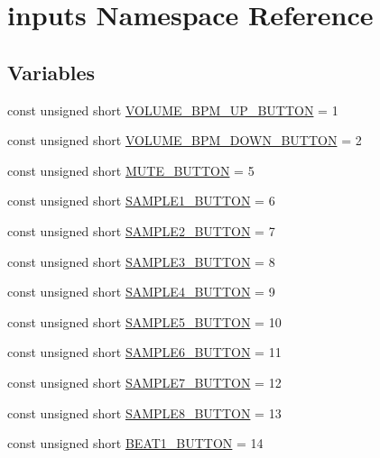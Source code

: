 \hypertarget{namespaceinputs}{}\section{inputs Namespace Reference}
\label{namespaceinputs}
\subsection*{Variables}
\begin{DoxyCompactItemize}
\item 
const unsigned short \hyperlink{namespaceinputs_ab1d58fe937ccabff6ec4011a74028bfb}{V\+O\+L\+U\+M\+E\+\_\+\+B\+P\+M\+\_\+\+U\+P\+\_\+\+B\+U\+T\+T\+ON} = 1
\item 
const unsigned short \hyperlink{namespaceinputs_af3cad6ab00b2670e1710698945d28c17}{V\+O\+L\+U\+M\+E\+\_\+\+B\+P\+M\+\_\+\+D\+O\+W\+N\+\_\+\+B\+U\+T\+T\+ON} = 2
\item 
const unsigned short \hyperlink{namespaceinputs_af0075a72395787966efcec2403306b43}{M\+U\+T\+E\+\_\+\+B\+U\+T\+T\+ON} = 5
\item 
const unsigned short \hyperlink{namespaceinputs_a39dbaf6935309e198c1a0bc6e3468c45}{S\+A\+M\+P\+L\+E1\+\_\+\+B\+U\+T\+T\+ON} = 6
\item 
const unsigned short \hyperlink{namespaceinputs_afcf2086c7f58f801e5654d8e573d928c}{S\+A\+M\+P\+L\+E2\+\_\+\+B\+U\+T\+T\+ON} = 7
\item 
const unsigned short \hyperlink{namespaceinputs_a17158d35ca30fb91c6f9f757ce0d7ccc}{S\+A\+M\+P\+L\+E3\+\_\+\+B\+U\+T\+T\+ON} = 8
\item 
const unsigned short \hyperlink{namespaceinputs_ac9ccac580f0955e454a367ddc6421d78}{S\+A\+M\+P\+L\+E4\+\_\+\+B\+U\+T\+T\+ON} = 9
\item 
const unsigned short \hyperlink{namespaceinputs_ad22ade847b4a38fd418dccda07814551}{S\+A\+M\+P\+L\+E5\+\_\+\+B\+U\+T\+T\+ON} = 10
\item 
const unsigned short \hyperlink{namespaceinputs_a88edcfa8b89df1abcca33bcec05974c4}{S\+A\+M\+P\+L\+E6\+\_\+\+B\+U\+T\+T\+ON} = 11
\item 
const unsigned short \hyperlink{namespaceinputs_a50972dcf524a7b7c420ca75b0ba72a29}{S\+A\+M\+P\+L\+E7\+\_\+\+B\+U\+T\+T\+ON} = 12
\item 
const unsigned short \hyperlink{namespaceinputs_a85f389284c616cd584390d04ad192ced}{S\+A\+M\+P\+L\+E8\+\_\+\+B\+U\+T\+T\+ON} = 13
\item 
const unsigned short \hyperlink{namespaceinputs_af62021422f469c370f42c78a72504a66}{B\+E\+A\+T1\+\_\+\+B\+U\+T\+T\+ON} = 14

\end{DoxyCompactItemize}
